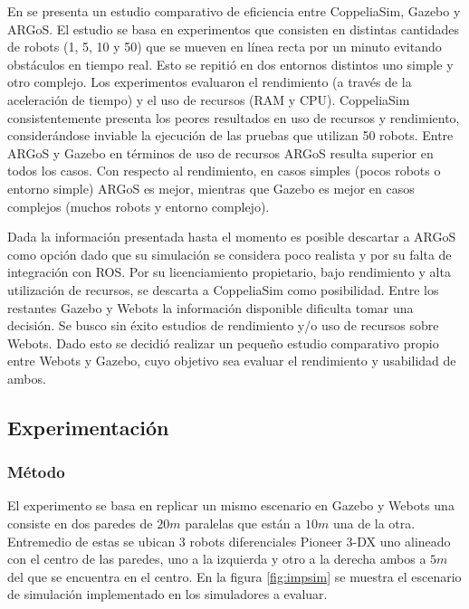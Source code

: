 En \cite{Pitonakova2018} se presenta un estudio comparativo de eficiencia entre
CoppeliaSim, Gazebo y ARGoS. El estudio se basa en experimentos que consisten
en distintas cantidades de robots (1, 5, 10 y 50) que se mueven en línea recta por un minuto
evitando obstáculos en tiempo real. Esto se repitió en dos entornos distintos
uno simple y otro complejo. Los experimentos evaluaron el rendimiento (a través
de la aceleración de tiempo) y el uso de recursos (RAM y CPU). CoppeliaSim
consistentemente presenta los peores resultados en uso de recursos y
rendimiento, considerándose inviable la ejecución de las pruebas que utilizan
50 robots. Entre ARGoS y Gazebo en términos de uso de recursos ARGoS resulta
superior en todos los casos. Con respecto al rendimiento, en casos simples
(pocos robots o entorno simple) ARGoS es mejor, mientras que Gazebo es mejor en
casos complejos (muchos robots y entorno complejo).

Dada la información presentada hasta el momento es posible descartar a ARGoS como
opción dado que su simulación se considera poco realista y por su falta de
integración con \gls{ROS}. Por su licenciamiento propietario, bajo rendimiento y alta
utilización de recursos, se descarta a CoppeliaSim como posibilidad. Entre los
restantes Gazebo y Webots la información disponible dificulta tomar una
decisión. Se busco sin éxito estudios de rendimiento y/o uso de recursos sobre
Webots. Dado esto se decidió realizar un pequeño estudio comparativo propio
entre Webots y Gazebo, cuyo objetivo sea evaluar el rendimiento y usabilidad de
ambos.

\subsection{Experimentación}

\subsubsection{Método}
El experimento se basa en replicar un mismo escenario en Gazebo y Webots una
consiste en dos paredes de $20m$ paralelas que están a $10m$ una de la otra.
Entremedio de estas se ubican 3 robots diferenciales Pioneer 3-DX \cite{p3dx} uno alineado
con el centro de las paredes, uno a la izquierda y otro a la derecha ambos a
$5m$ del que se encuentra en el centro. En la figura \ref{fig:impsim} se
muestra el escenario de simulación implementado en los simuladores a evaluar.

